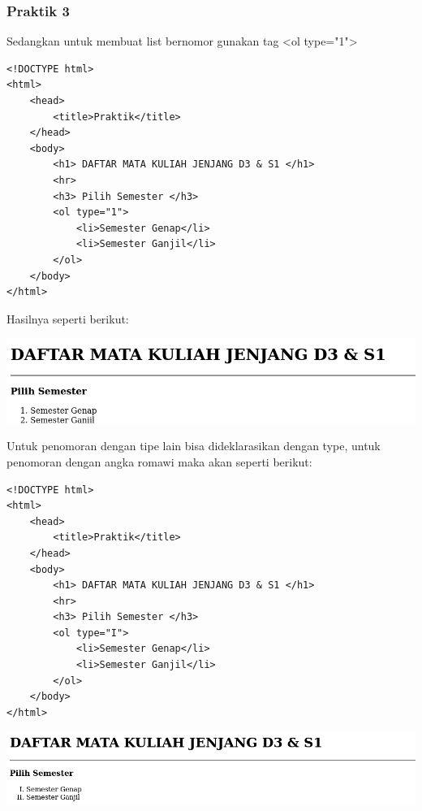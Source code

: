 \documentclass[a4paper,12pt]{article}
\begin{document}
\subsubsection{Praktik 3}
Sedangkan untuk membuat list bernomor gunakan tag <ol type="1">
\begin{lstlisting}
<!DOCTYPE html>
<html>
    <head>
        <title>Praktik</title>
    </head>
    <body>
        <h1> DAFTAR MATA KULIAH JENJANG D3 & S1 </h1>
        <hr>
        <h3> Pilih Semester </h3>
        <ol type="1">
            <li>Semester Genap</li>
            <li>Semester Ganjil</li>
        </ol>
    </body>
</html>
\end{lstlisting}
Hasilnya seperti berikut:\\
\begin{center}
    \includegraphics[width=\linewidth]{4.png}
\end{center}
Untuk penomoran dengan tipe lain bisa dideklarasikan dengan type, untuk penomoran dengan angka romawi maka akan seperti berikut:
\begin{lstlisting}
<!DOCTYPE html>
<html>
    <head>
        <title>Praktik</title>
    </head>
    <body>
        <h1> DAFTAR MATA KULIAH JENJANG D3 & S1 </h1>
        <hr>
        <h3> Pilih Semester </h3>
        <ol type="I">
            <li>Semester Genap</li>
            <li>Semester Ganjil</li>
        </ol>
    </body>
</html>
\end{lstlisting}
\begin{center}
    \includegraphics[width=\linewidth]{1a.png}
\end{center}
\end{document}
